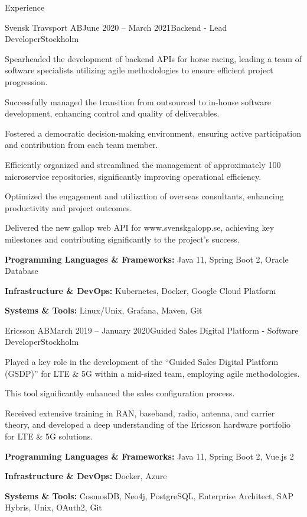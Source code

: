 \documentclass{resume}
\begin{document}
\begin{rSection}{Experience}
    \begin{rSubsection}{Svensk Travsport AB}{June 2020 -- March 2021}{Backend - Lead Developer}{Stockholm}
      \item Spearheaded the development of backend APIs for horse racing, leading a team of software specialists utilizing agile methodologies to ensure efficient project progression.
      \item Successfully managed the transition from outsourced to in-house software development, enhancing control and quality of deliverables.
      \item Fostered a democratic decision-making environment, ensuring active participation and contribution from each team member.
      \item Efficiently organized and streamlined the management of approximately 100 microservice repositories, significantly improving operational efficiency.
      \item Optimized the engagement and utilization of overseas consultants, enhancing productivity and project outcomes.
      \item Delivered the new gallop web API for www.svenskgalopp.se, achieving key milestones and contributing significantly to the project's success.
      \item \textbf{Programming Languages \& Frameworks:} Java 11, Spring Boot 2, Oracle Database
      \item \textbf{Infrastructure \& DevOps:} Kubernetes, Docker, Google Cloud Platform
      \item \textbf{Systems \& Tools:} Linux/Unix, Grafana, Maven, Git
    \end{rSubsection}

    \begin{rSubsection}{Ericsson AB}{March 2019 -- January 2020}{Guided Sales Digital Platform - Software Developer}{Stockholm}
      \item Played a key role in the development of the ``Guided Sales Digital Platform (GSDP)'' for LTE \& 5G within a mid-sized team, employing agile methodologies.
      \item This tool significantly enhanced the sales configuration process.
      \item Received extensive training in RAN, baseband, radio, antenna, and carrier theory, and developed a deep understanding of the Ericsson hardware portfolio for LTE \& 5G solutions.
      \item \textbf{Programming Languages \& Frameworks:} Java 11, Spring Boot 2, Vue.js 2
      \item \textbf{Infrastructure \& DevOps:} Docker, Azure
      \item \textbf{Systems \& Tools:} CosmosDB, Neo4j, PostgreSQL, Enterprise Architect, SAP Hybris, Unix, OAuth2, Git
    \end{rSubsection}


\end{rSection}
\end{document}
